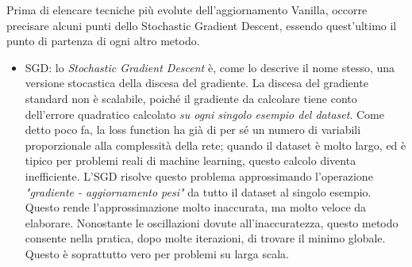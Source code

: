 Prima di elencare tecniche più evolute dell'aggiornamento Vanilla, occorre precisare alcuni punti dello Stochastic Gradient Descent, essendo quest'ultimo il punto di partenza di ogni altro metodo. 

\begin{itemize}
\item \textsc{SGD}: lo \emph{Stochastic Gradient Descent} è, come lo descrive il nome stesso, una versione stocastica della discesa del gradiente. La discesa del gradiente standard non è scalabile, poiché il gradiente da calcolare tiene conto dell'errore quadratico calcolato \emph{su ogni singolo esempio del dataset}. Come detto poco fa, la loss function ha già di per sé un numero di variabili proporzionale alla complessità della rete; quando il dataset è molto largo, ed è tipico per problemi reali di machine learning, questo calcolo diventa inefficiente. L'SGD risolve questo problema approssimando l'operazione \emph{"gradiente - aggiornamento pesi"} da tutto il dataset al singolo esempio. Questo rende l'approssimazione molto inaccurata, ma molto veloce da elaborare. Nonostante le oscillazioni dovute all'inaccuratezza, questo metodo consente nella pratica, dopo molte iterazioni, di trovare il minimo globale. Questo è soprattutto vero per problemi su larga scala. 


\end{itemize}
